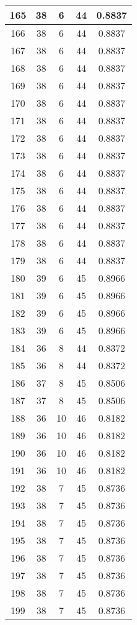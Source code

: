 \documentclass[letterpaper, 12pt]{article}
\begin{document}
\begin{longtable}{|c|c|c|c|c|}
\hline
165 & 38 & 6 & 44 & 0.8837 \\
\hline
166 & 38 & 6 & 44 & 0.8837 \\
\hline
167 & 38 & 6 & 44 & 0.8837 \\
\hline
168 & 38 & 6 & 44 & 0.8837 \\
\hline
169 & 38 & 6 & 44 & 0.8837 \\
\hline
170 & 38 & 6 & 44 & 0.8837 \\
\hline
171 & 38 & 6 & 44 & 0.8837 \\
\hline
172 & 38 & 6 & 44 & 0.8837 \\
\hline
173 & 38 & 6 & 44 & 0.8837 \\
\hline
174 & 38 & 6 & 44 & 0.8837 \\
\hline
175 & 38 & 6 & 44 & 0.8837 \\
\hline
176 & 38 & 6 & 44 & 0.8837 \\
\hline
177 & 38 & 6 & 44 & 0.8837 \\
\hline
178 & 38 & 6 & 44 & 0.8837 \\
\hline
179 & 38 & 6 & 44 & 0.8837 \\
\hline
180 & 39 & 6 & 45 & 0.8966 \\
\hline
181 & 39 & 6 & 45 & 0.8966 \\
\hline
182 & 39 & 6 & 45 & 0.8966 \\
\hline
183 & 39 & 6 & 45 & 0.8966 \\
\hline
184 & 36 & 8 & 44 & 0.8372 \\
\hline
185 & 36 & 8 & 44 & 0.8372 \\
\hline
186 & 37 & 8 & 45 & 0.8506 \\
\hline
187 & 37 & 8 & 45 & 0.8506 \\
\hline
188 & 36 & 10 & 46 & 0.8182 \\
\hline
189 & 36 & 10 & 46 & 0.8182 \\
\hline
190 & 36 & 10 & 46 & 0.8182 \\
\hline
191 & 36 & 10 & 46 & 0.8182 \\
\hline
192 & 38 & 7 & 45 & 0.8736 \\
\hline
193 & 38 & 7 & 45 & 0.8736 \\
\hline
194 & 38 & 7 & 45 & 0.8736 \\
\hline
195 & 38 & 7 & 45 & 0.8736 \\
\hline
196 & 38 & 7 & 45 & 0.8736 \\
\hline
197 & 38 & 7 & 45 & 0.8736 \\
\hline
198 & 38 & 7 & 45 & 0.8736 \\
\hline
199 & 38 & 7 & 45 & 0.8736 \\
\hline
\end{longtable}
\end{document}
